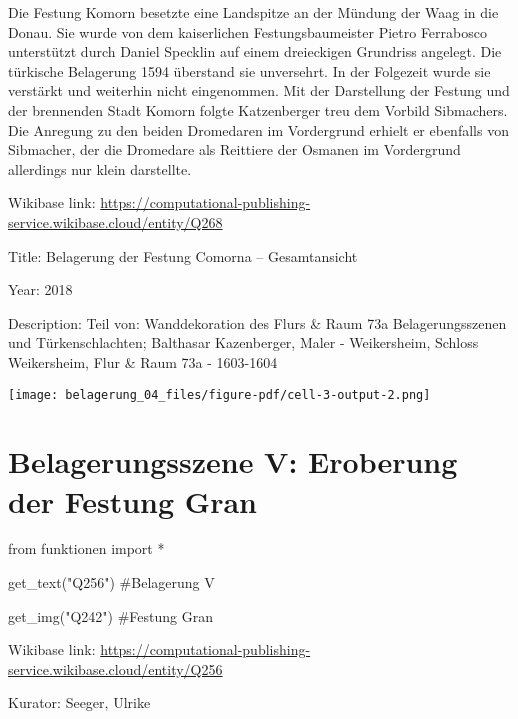 \documentclass[
  a4paper,
  portrait]{book}
\newenvironment{Shaded}{\begin{snugshade}}{\end{snugshade}}
\newcommand{\CommentTok}[1]{\textcolor[rgb]{0.37,0.37,0.37}{#1}}
\newcommand{\ImportTok}[1]{\textcolor[rgb]{0.00,0.46,0.62}{#1}}
\newcommand{\NormalTok}[1]{\textcolor[rgb]{0.00,0.23,0.31}{#1}}
\newcommand{\OperatorTok}[1]{\textcolor[rgb]{0.37,0.37,0.37}{#1}}
\newcommand{\StringTok}[1]{\textcolor[rgb]{0.13,0.47,0.30}{#1}}
\begin{document}
Die Festung Komorn besetzte eine Landspitze an der Mündung der Waag in
die Donau. Sie wurde von dem kaiserlichen Festungsbaumeister Pietro
Ferrabosco unterstützt durch Daniel Specklin auf einem dreieckigen
Grundriss angelegt. Die türkische Belagerung 1594 überstand sie
unversehrt. In der Folgezeit wurde sie verstärkt und weiterhin nicht
eingenommen. Mit der Darstellung der Festung und der brennenden Stadt
Komorn folgte Katzenberger treu dem Vorbild Sibmachers. Die Anregung zu
den beiden Dromedaren im Vordergrund erhielt er ebenfalls von Sibmacher,
der die Dromedare als Reittiere der Osmanen im Vordergrund allerdings
nur klein darstellte.

Wikibase link:
\url{https://computational-publishing-service.wikibase.cloud/entity/Q268}

Title: Belagerung der Festung Comorna -- Gesamtansicht

Year: 2018

Description: Teil von: Wanddekoration des Flurs \& Raum 73a
Belagerungsszenen und Türkenschlachten; Balthasar Kazenberger, Maler -
Weikersheim, Schloss Weikersheim, Flur \& Raum 73a - 1603-1604

\texttt{[image: belagerung\_04\_files/figure-pdf/cell-3-output-2.png]}

\chapter{Belagerungsszene V: Eroberung der Festung
Gran}\label{belagerungsszene-v-eroberung-der-festung-gran}

\begin{Shaded}
\begin{Highlighting}[]
\ImportTok{from}\NormalTok{ funktionen }\ImportTok{import} \OperatorTok{*}
\end{Highlighting}
\end{Shaded}

\begin{Shaded}
\begin{Highlighting}[]
\NormalTok{get\_text(}\StringTok{"Q256"}\NormalTok{)}
\CommentTok{\#Belagerung V}

\NormalTok{get\_img(}\StringTok{"Q242"}\NormalTok{)}
\CommentTok{\#Festung Gran}
\end{Highlighting}
\end{Shaded}

Wikibase link:
\url{https://computational-publishing-service.wikibase.cloud/entity/Q256}

Kurator: Seeger, Ulrike
\end{document}
